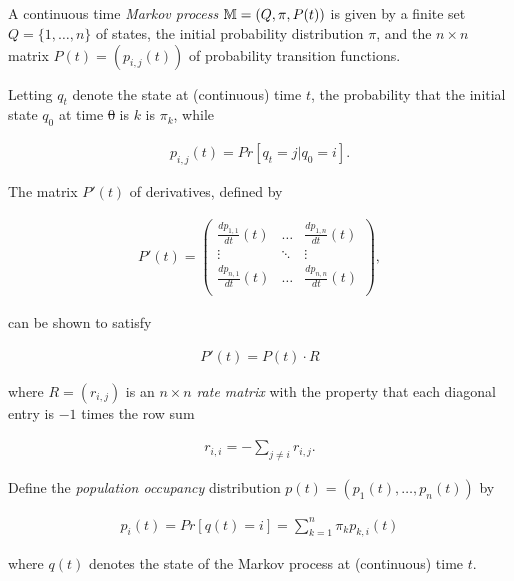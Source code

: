 \documentclass[11pt, oneside]{Thesis} %
\providecommand{\DIFadd}[1]{{\protect\color{blue}\uwave{#1}}} %
\providecommand{\DIFdel}[1]{{\protect\color{red}\sout{#1}}}                      %
\providecommand{\DIFaddbegin}{} %
\providecommand{\DIFaddend}{} %
\providecommand{\DIFdelbegin}{} %
\providecommand{\DIFdelend}{} %
\begin{document}
\subsection{\Eqt}
\label{subsec:hermes:eq}

A continuous time {\em Markov process} $\mathbb{M}=(Q,\pi,P(t))$
is given by a finite set $Q= \{1,\dots,n\}$ of states, the
initial probability distribution $\pi$,
and the $n\times n$ matrix $P(t)=(p_{i,j}(t))$ of
probability transition functions.

Letting $q_t$ denote the state at (continuous)
time $t$, the probability that the initial state $q_0$ at time \DIFdelbegin \DIFdel{0 }\DIFdelend \DIFaddbegin \DIFadd{$0$ }\DIFaddend is
$k$ is $\pi_k$, while

\begin{align}
\label{eq:hermes:markovProcess}
p_{i,j}(t) = Pr[q_{t} = j| q_0 = i].
\end{align}

The matrix $P'(t)$ of derivatives, defined by

\begin{align}
  P'(t) = \left(
\begin{array}{ccc}
\frac{d p_{1,1}}{d t}(t) & \dots  & \frac{d p_{1,n}}{d t}(t)\\
\vdots & \ddots & \vdots \\
 \frac{d p_{n,1}}{d t}(t) & \dots  & \frac{d p_{n,n}}{d t}(t)\\
\end{array}
\right),
\end{align}

can be shown to satisfy

\begin{align}
P'(t) = P(t) \cdot R
\end{align}

where $R = (r_{i,j})$ is an $n \times n$ {\em rate matrix} with the
property that each diagonal entry is $-1$ times the row sum

\begin{align}
r_{i,i} = - \sum_{j\ne i} r_{i,j}.
\end{align}

Define the {\em population occupancy} distribution
$p(t) = (p_1(t),\dots,p_n(t))$ by

\begin{align}
\label{eq:hermes:markovProcessPopulationFreq}
p_i(t) = Pr[q(t) = i] = \sum_{k=1}^n\pi_k p_{k,i}(t)
\end{align}

where $q(t)$ denotes the state of the Markov process
at (continuous) time $t$.
\end{document}
